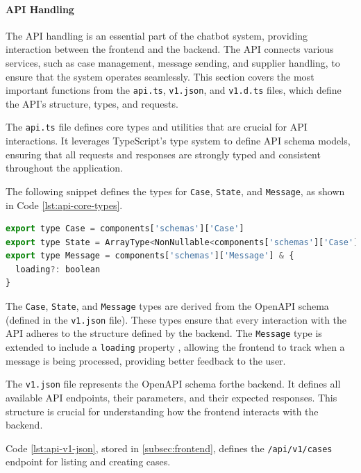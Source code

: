 \paragraph{API Handling}

The \ac{API} handling is an essential part of the chatbot system, providing interaction between the frontend and the
backend. The \ac{API} connects various services, such as case management, message sending, and supplier handling, to
ensure that the system operates seamlessly. This section covers the most important functions from the \texttt{api.ts},
\texttt{v1.json}, and \texttt{v1.d.ts} files, which define the \ac{API}'s structure, types, and requests.

The \texttt{api.ts}
file defines core types and utilities that are crucial for \ac{API} interactions. It leverages TypeScript's type system
to define \ac{API} schema models, ensuring that all requests and responses are strongly typed and consistent throughout
the application.

The following snippet defines the types for \texttt{Case}, \texttt{State}, and \texttt{Message}, as shown in Code
\ref{lst:api-core-types}.

\begin{lstlisting}[language=JavaScript, caption={Core API Types (\texttt{api.ts})},
  firstnumber=1,label={lst:api-core-types}]
export type Case = components['schemas']['Case']
export type State = ArrayType<NonNullable<components['schemas']['Case']['state']>>
export type Message = components['schemas']['Message'] & {
  loading?: boolean
}
\end{lstlisting}

The \texttt{Case}, \texttt{State}, and \texttt{Message} types are derived from the OpenAPI schema (defined in the
\texttt{v1.json} file). These types ensure that every interaction with the \ac{API} adheres to the structure
defined by the backend. The \texttt{Message} type is extended to include a \texttt{loading} property
, allowing the frontend to track when a message is being processed, providing better feedback to the user.

The \texttt{v1.json} file represents the OpenAPI schema forthe backend. It defines all available \ac{API} endpoints,
their parameters, and their expected responses. This structure is crucial for understanding how the frontend interacts
with the backend.

Code \ref{lst:api-v1-json}, stored in \ref{subsec:frontend}, defines the \texttt{/api/v1/cases} endpoint for listing and
creating cases.


